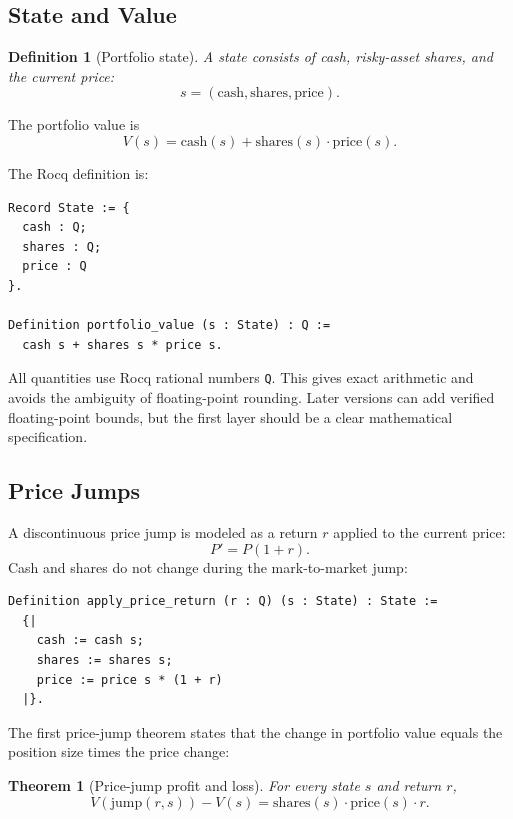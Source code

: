 \documentclass[11pt]{article}
\newtheorem{theorem}{Theorem}
\newtheorem{definition}{Definition}
\begin{document}
\subsection{State and Value}

\begin{definition}[Portfolio state]
A state consists of cash, risky-asset shares, and the current price:
\[
  s = (\mathrm{cash}, \mathrm{shares}, \mathrm{price}).
\]
\end{definition}

The portfolio value is
\[
  V(s) = \mathrm{cash}(s) + \mathrm{shares}(s)\cdot\mathrm{price}(s).
\]

The Rocq definition is:

\begin{lstlisting}[language=Coq]
Record State := {
  cash : Q;
  shares : Q;
  price : Q
}.

Definition portfolio_value (s : State) : Q :=
  cash s + shares s * price s.
\end{lstlisting}

All quantities use Rocq rational numbers \texttt{Q}. This gives exact
arithmetic and avoids the ambiguity of floating-point rounding. Later versions
can add verified floating-point bounds, but the first layer should be a clear
mathematical specification.

\subsection{Price Jumps}

A discontinuous price jump is modeled as a return \(r\) applied to the current
price:
\[
  P' = P(1+r).
\]
Cash and shares do not change during the mark-to-market jump:

\begin{lstlisting}[language=Coq]
Definition apply_price_return (r : Q) (s : State) : State :=
  {|
    cash := cash s;
    shares := shares s;
    price := price s * (1 + r)
  |}.
\end{lstlisting}

The first price-jump theorem states that the change in portfolio value equals
the position size times the price change:

\begin{theorem}[Price-jump profit and loss]
For every state \(s\) and return \(r\),
\[
  V(\mathrm{jump}(r,s)) - V(s)
  = \mathrm{shares}(s)\cdot\mathrm{price}(s)\cdot r.
\]
\end{theorem}
\end{document}
